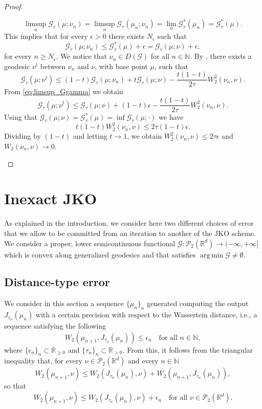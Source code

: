 \documentclass[11pt]{article}
\DeclareMathOperator*{\argmin}{arg\,min}
\newcommand{\cP}{\mathcal{P}}
\newcommand{\cG}{\mathcal{G}}
\newcommand{\R}{\mathbb{R}}
\newcommand{\N}{\mathbb{N}}
\newcommand{\RR}{(-\infty,+\infty]}
\numberwithin{equation}{section}
\begin{document}
\begin{proof}
\begin{itemize}
		\[\limsup_n \cG_\tau(\mu;\nu_n) = \limsup_n \cG_\tau(\mu_n;\nu_n) = \lim_n \cG_\tau^*(\mu_n)= \cG_\tau^*(\mu).\]
		This implies that for every $\epsilon > 0$ there exists $N_{\epsilon}$ such that \begin{equation}\label{eq:limsup_Ggamma}
			\cG_\tau(\mu;\nu_n)\leq \cG_\tau^*(\mu) + \epsilon = \cG_\tau(\mu;\nu) + \epsilon,
		\end{equation}
		for every $n \geq N_{\epsilon}$. We notice that $\nu_n\in D(\cG)$ for all $n\in \N$. By \cite[Lemma 9.2.7]{AGS08}, there exists a geodesic $\nu^t$ between $\nu_n$ and $\nu$, with base point $\mu$, such that
		\[\cG_\tau (\mu; \nu^t)\leq (1-t)\cG_\tau (\mu;\nu_n)+t\cG_\tau (\mu;\nu)-\frac{ t(1-t)}{2\tau}W_2^2(\nu_n,\nu).\] 
		From \eqref{eq:limsup_Ggamma} we obtain
		\[\cG_\tau (\mu;\nu^t)\leq \cG_\tau (\mu;\nu)+(1-t)\epsilon- \frac{t(1-t)}{2\tau}W_2^2(\nu_n,\nu).\]
		Using that $\cG_\tau(\mu;\nu)=\cG_\tau^*(\mu)= \inf \cG_\tau(\mu;\cdot)$ we have
		\[t(1-t)W_2^2(\nu_n,\nu) \leq 2\tau(1-t)\epsilon.\]
		Dividing by $(1-t)$ and letting $t\to 1$, we obtain $W_2^2(\nu_n,\nu)\leq 2\tau \epsilon$ and $W_2(\nu_n,\nu)\to 0$.
	\end{itemize}
\end{proof}

\section{Inexact JKO}\label{sec:JKO}

As explained in the introduction, we consider here two different choices of error that we allow to be committed from an iteration to another of the JKO scheme. We consider a proper, lower semicontinuous functional $\cG : \cP_2(\R^d) \to \RR$ which is convex along generalized geodesics and that satisfies $\argmin \cG \neq \emptyset$.

\subsection{Distance-type error}\label{sec:first_error} We consider in this section a sequence  $\{\mu_n\}_n$ generated computing the output $J_{\tau_n}(\mu_n)$ with a certain precision with respect to the Wassertein distance, i.e., a sequence satisfying the following
\begin{equation*}
	W_2(\mu_{n+1},J_{\tau_n}(\mu_n))\leq \epsilon_n \quad \text{for all } n\in \N,
\end{equation*}
where $\{\epsilon_n\}_n\subset \R_{\geq 0}$ and $\{\tau_n\}_n\subset \R_{> 0}$. From this, it follows from the triangular inequality that, for every $\nu\in \cP_2(\R^d)$ and every $n\in \N$
\[W_2(\mu_{n+1},\nu)\leq W_2(J_{\tau_n}(\mu_n),\nu)+W_2(\mu_{n+1},J_{\tau_n}(\mu_n)),\]
so that
\begin{equation*}
	W_2(\mu_{n+1},\nu) \leq W_2(J_{\tau_n}(\mu_n),\nu) + \epsilon_n \quad \text{for all } \nu\in \cP_2(\R^d).
\end{equation*}
\end{document}
